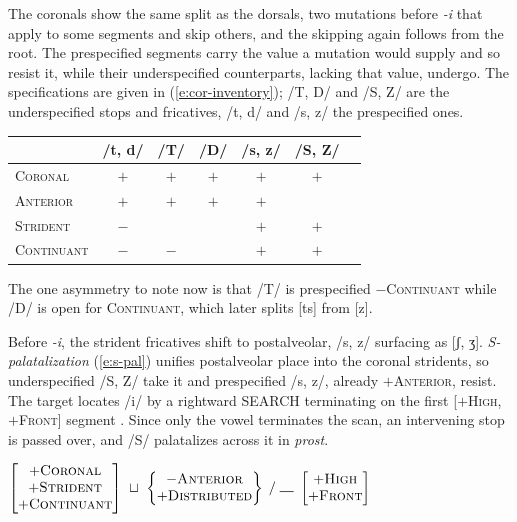 \documentclass[11pt,letterpaper]{article}
\newcommand{\gap}{\rule{1em}{0.5pt}}
\newcommand{\word}[1]{\textit{#1}}
\newcommand{\term}[1]{\textit{#1}}
\newcommand{\feature}[1]{\textsc{#1}}
\newcommand{\featspec}[2]{\ensuremath{#1}\textsc{#2}}
\begin{document}
\newpage

\bigskip\noindent
The coronals show the same split as the dorsals, two mutations before \word{-i} that apply to some segments and skip others, and the skipping again follows from the root.
The prespecified segments carry the value a mutation would supply and so resist it, while their underspecified counterparts, lacking that value, undergo.
The specifications are given in (\ref{e:cor-inventory}); /T, D/ and /S, Z/ are the underspecified stops and fricatives, /t, d/ and /s, z/ the prespecified ones.

\begin{unlabeledexample}
\small
\begin{tabular}{l cccccc}
          & /t, d/ & /T/ & /D/ & /s, z/ & /S, Z/ \\
\midrule
\feature{Coronal}    & $+$ & $+$ & $+$ & $+$ & $+$ \\
\feature{Anterior}   & $+$ & $+$ & $+$ & $+$ &     \\
\feature{Strident}   & $-$ &     &     & $+$ & $+$ \\
\feature{Continuant} & $-$ & $-$ &     & $+$ & $+$ \\
\end{tabular}
\label{e:cor-inventory}
\end{unlabeledexample}

\noindent
The one asymmetry to note now is that /T/ is prespecified \featspec{-}{Continuant} while /D/ is open for \feature{Continuant}, which later splits [ts] from [z].

\bigskip\noindent
Before \word{-i}, the strident fricatives shift to postalveolar, /s, z/ surfacing as [ʃ, ʒ].
\term{S-palatalization} (\ref{e:s-pal}) unifies postalveolar place into the coronal stridents, so underspecified /S, Z/ take it and prespecified /s, z/, already \featspec{+}{Anterior}, resist.
The target locates /i/ by a rightward SEARCH terminating on the first [\featspec{+}{High}, \featspec{+}{Front}] segment \citep{Dabbous:EtAl:21,Dabbous:EtAl:24,Azadegan:26}.
Since only the vowel terminates the scan, an intervening stop is passed over, and /S/ palatalizes across it in \word{prost}.

\begin{unlabeledexample}
\small\hfill$\displaystyle
\begin{bmatrix}
\featspec{+}{Coronal}\\
\featspec{+}{Strident}\\
\featspec{+}{Continuant}
\end{bmatrix}
~\sqcup~
\begin{Bmatrix}
\featspec{-}{Anterior}\\
\featspec{+}{Distributed}
\end{Bmatrix}
\;/\;\gap~
\begin{bmatrix}
\featspec{+}{High}\\
\featspec{+}{Front}
\end{bmatrix}
$\hfill\null
\label{e:s-pal}
\end{unlabeledexample}
\end{document}
